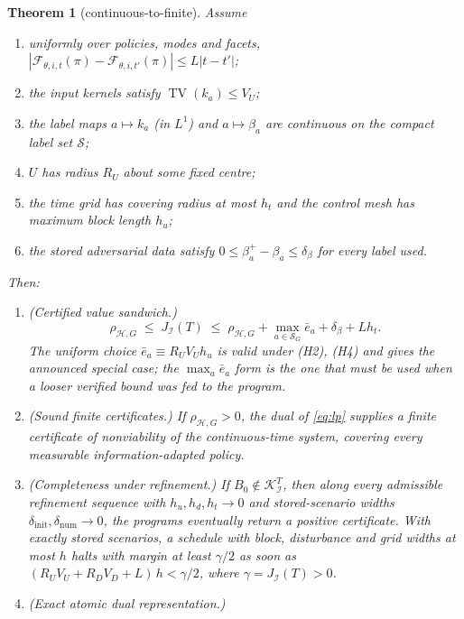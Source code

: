 \documentclass[11pt,a4paper]{article}
\theoremstyle{plain}
\newtheorem{theorem}{Theorem}[section]
\theoremstyle{definition}
\theoremstyle{remark}
\newcommand{\calI}{\mathcal{I}}
\newcommand{\calH}{\mathcal{H}}
\newcommand{\calK}{\mathcal{K}}
\newcommand{\calF}{\mathcal{F}}
\newcommand{\calS}{\mathscr{S}}
\newcommand{\J}{J_{\calI}(T)}
\newcommand{\rhoHG}{\rho_{\calH,G}}
\newcommand{\ebar}{\bar{e}}
\DeclareMathOperator{\TV}{TV}
\begin{document}
\begin{theorem}[continuous-to-finite]\label{thm:bridge}
Assume
\begin{enumerate}[label=\textup{(H\arabic*)},leftmargin=3em,itemsep=1pt]
\item uniformly over policies, modes and facets, $|\calF_{\theta,i,t}(\pi)-\calF_{\theta,i,t'}(\pi)|\le L|t-t'|$;
\item the input kernels satisfy $\TV(k_a)\le V_U$;
\item the label maps $a\mapsto k_a$ (in $L^1$) and $a\mapsto\beta_a$ are continuous on the compact label set $\calS$;
\item $U$ has radius $R_U$ about some fixed centre;
\item the time grid has covering radius at most $h_t$ and the control mesh has maximum block length $h_u$;
\item the stored adversarial data satisfy $0\le\beta^+_a-\beta_a\le\delta_\beta$ for every label used.
\end{enumerate}
Then:
\begin{enumerate}[label=\textup{(\roman*)},leftmargin=2.4em,itemsep=2pt]
\item \textup{(Certified value sandwich.)}
\begin{equation}\label{eq:sandwich}
\rhoHG\;\le\;\J\;\le\;\rhoHG+\max_{a\in\calS_G}\ebar_a+\delta_\beta+Lh_t .
\end{equation}
The uniform choice $\ebar_a\equiv R_UV_Uh_u$ is valid under \textup{(H2), (H4)} and gives the announced special case; the $\max_a\ebar_a$ form is the one that must be used when a looser verified bound was fed to the program.
\item \textup{(Sound finite certificates.)} If $\rhoHG>0$, the dual of \eqref{eq:lp} supplies a finite certificate of nonviability of the continuous-time system, covering every measurable information-adapted policy.
\item \textup{(Completeness under refinement.)} If $B_0\notin\calK^T_\calI$, then along every admissible refinement sequence with $h_u,h_d,h_t\to0$ and stored-scenario widths $\delta_{\mathrm{init}},\delta_{\mathrm{num}}\to0$, the programs eventually return a positive certificate. With exactly stored scenarios, a schedule with block, disturbance and grid widths at most $h$ halts with margin at least $\gamma/2$ as soon as $(R_UV_U+R_DV_D+L)\,h<\gamma/2$, where $\gamma=\J>0$.
\item \textup{(Exact atomic dual representation.)}
\begin{equation}\label{eq:atomic}

\end{equation}
\end{enumerate}
\end{theorem}
\end{document}
